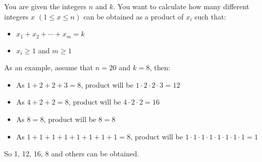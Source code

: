 You are given the integers $n$ and $k$. You want to calculate how many
different integers $x$ $(1\le x \le n)$ can be obtained as a product of $x_i$
such that:

\begin{itemize}
  \item $x_1 + x_2 + \cdots + x_m = k$
  \item $x_i \ge 1$ and $m \ge 1$
\end{itemize}

As an example, assume that $n = 20$ and $k=8$, then:

\begin{itemize}
  \item As $1+2+2+3 = 8$, product will be $1 \cdot 2\cdot 2 \cdot 3 = 12$
  \item As $4+2+2=8$, product will be $4\cdot 2\cdot 2  = 16$
  \item As $8=8$, product will be $8=8$
  \item As $1+1+1+1+1+1+1+1 = 8$, product will be $1\cdot1\cdot1\cdot1\cdot1\cdot1\cdot1\cdot1 = 1$
\end{itemize}

So 1, 12, 16, 8 and others can be obtained.



\sampleio
